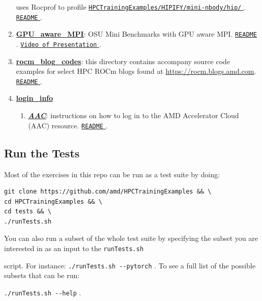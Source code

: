 \documentclass[
]{article}
\providecommand{\tightlist}{%
  \setlength{\itemsep}{0pt}\setlength{\parskip}{0pt}}
\let\oldtexttt\texttt
\renewcommand{\texttt}[1]{
  \colorbox{Light}{\oldtexttt{#1}}
}
\providecommand{\tightlist}{%
  \setlength{\itemsep}{0pt}\setlength{\parskip}{0pt}}
\begin{document}
\begin{enumerate}
  uses Rocprof to profile
  \href{https://github.com/amd/HPCTrainingExamples/tree/main/HIPIFY/mini-nbody/hip}{\texttt{HPCTrainingExamples/HIPIFY/mini-nbody/hip/}}.
  \href{https://github.com/amd/HPCTrainingExamples/tree/main/Rocprof/README.md}{\texttt{README}}.
\item
  \href{https://github.com/amd/HPCTrainingExamples/tree/main/GPU_aware_MPI}{\textbf{GPU\_aware\_MPI}}:
  OSU Mini Benchmarks with GPU aware MPI.
  \href{https://github.com/amd/HPCTrainingExamples/tree/main/GPU_aware_MPI/README.md}{\texttt{README}}.
  \href{https://fs.hlrs.de/projects/par/events/2024/GPU-AMD/day3/GPU-AwareMPI.mp4}{\texttt{Video\ of\ Presentation}}.
\item
  \href{https://github.com/amd/HPCTrainingExamples/tree/main/rocm_blog_codes}{\textbf{rocm\_blog\_codes}}:
  this directory contains accompany source code examples for select HPC
  ROCm blogs found at \url{https://rocm.blogs.amd.com}.
  \href{https://github.com/amd/HPCTrainingExamples/tree/main/rocm_blog_codesi/README.md}{\texttt{README}}.
\item
  \href{https://github.com/amd/HPCTrainingExamples/tree/main/login_info}{\textbf{login\_info}}

  \begin{enumerate}
  \def\labelenumii{\arabic{enumii}.}
  \tightlist
  \item
    \href{https://github.com/amd/HPCTrainingExamples/tree/main/login_info/AAC}{\textbf{\emph{AAC}}}:
    instructions on how to log in to the AMD Accelerator Cloud (AAC)
    resource.
    \href{https://github.com/amd/HPCTrainingExamples/tree/main/login_info/AAC/README.md}{\texttt{README}}.
  \end{enumerate}
\end{enumerate}

\hypertarget{run-the-tests}{%
\subsection{Run the Tests}\label{run-the-tests}}

Most of the exercises in this repo can be run as a test suite by doing:

\begin{verbatim}
git clone https://github.com/amd/HPCTrainingExamples && \
cd HPCTrainingExamples && \
cd tests && \
./runTests.sh
\end{verbatim}

You can also run a subset of the whole test suite by specifying the
subset you are interested in as an input to the \texttt{runTests.sh}
script. For instance: \texttt{./runTests.sh\ -\/-pytorch}. To see a full
list of the possible subsets that can be run:
\texttt{./runTests.sh\ -\/-help}.
\end{document}
